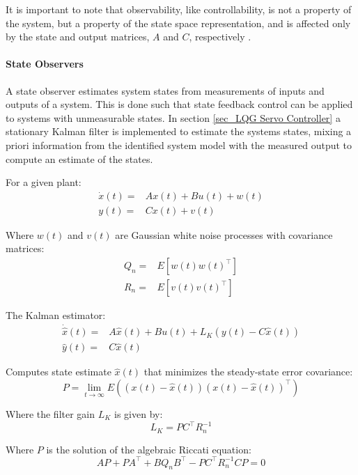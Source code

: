 \documentclass[  10pt, twoside]{report} %
\numberwithin{equation}{chapter}
\begin{document}
It is important to note that observability, like controllability, is not a property of the system, but a property of the state space representation, and is affected only by the state and output matrices, $A$ and $C$, respectively \citep{Botto}.

\paragraph{State Observers}
A state observer estimates system states from measurements of inputs and outputs of a system. This is done such that state feedback control can be applied to systems with unmeasurable states. In section \ref{sec_LQG Servo Controller} a stationary Kalman filter %
is implemented to estimate the systems states, mixing a priori information from the identified system model with the measured output to compute an estimate of the states.

For a given plant:
\begin{align}   
    \dot{x}(t) =& A x(t) + B u(t) +  w(t) \\
    y(t) =& C x(t) + v(t)
\end{align}

Where $w(t)$ and $v(t)$ are Gaussian white noise processes with covariance matrices:
\begin{align}
    Q_n =& E\left[ w(t) w(t)^\intercal\right] \\
    R_n =& E\left[ v(t) v(t)^\intercal\right] 
\end{align}

The Kalman estimator:
\begin{align}   
    \dot{\widehat{x}}(t) =& A \widehat{x}(t) + B u(t) + L_K \left( y(t) - C \widehat{x}(t) \right) \\
    \widehat{y}(t) =& C \widehat{x}(t) 
\end{align}

Computes state estimate $\widehat{x}(t)$ that minimizes the steady-state error covariance:
\begin{equation}
    P = \lim_{t \rightarrow \infty} E \left( (x(t) - \widehat{x}(t)) (x(t) - \widehat{x}(t))^\intercal \right)
\end{equation}

Where the filter gain $L_K$ is given by:
\begin{equation}
    L_K = P C^\intercal R^{-1}_n
\end{equation}

Where $P$ is the solution of the algebraic Riccati equation:
\begin{equation}
    A P + P A^\intercal + B Q_n B^\intercal - P C^\intercal R^{-1}_n C P = 0
\end{equation}
\end{document}
